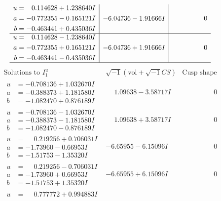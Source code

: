 \documentclass[1p]{elsarticle_modified}
\theoremstyle{definition}
\newcommand{\I}{\sqrt{-1}}
\begin{document}
$$\begin{array}{c|c|c}
\begin{aligned}
u &= \phantom{-}0.114628 + 1.238640 I \\
a &= -0.772355 - 0.165121 I \\
b &= -0.463441 + 0.435036 I\end{aligned}
 & -6.04736 - 1.91666 I & \phantom{-0.000000 } 0 \\ \hline\begin{aligned}
u &= \phantom{-}0.114628 - 1.238640 I \\
a &= -0.772355 + 0.165121 I \\
b &= -0.463441 - 0.435036 I\end{aligned}
 & -6.04736 + 1.91666 I & \phantom{-0.000000 } 0\\
 \hline 
 \end{array}$$\newpage$$\begin{array}{c|c|c}  
\text{Solutions to }I^u_{1}& \I (\text{vol} + \sqrt{-1}CS) & \text{Cusp shape}\\
 \hline 
\begin{aligned}
u &= -0.708136 + 1.032670 I \\
a &= -0.388373 + 1.181580 I \\
b &= -1.082470 + 0.876189 I\end{aligned}
 & \phantom{-}1.09638 - 3.58717 I & \phantom{-0.000000 } 0 \\ \hline\begin{aligned}
u &= -0.708136 - 1.032670 I \\
a &= -0.388373 - 1.181580 I \\
b &= -1.082470 - 0.876189 I\end{aligned}
 & \phantom{-}1.09638 + 3.58717 I & \phantom{-0.000000 } 0 \\ \hline\begin{aligned}
u &= \phantom{-}0.219256 + 0.706031 I \\
a &= -1.73960 - 0.66953 I \\
b &= -1.51753 - 1.35320 I\end{aligned}
 & -6.65955 - 6.15096 I & \phantom{-0.000000 } 0 \\ \hline\begin{aligned}
u &= \phantom{-}0.219256 - 0.706031 I \\
a &= -1.73960 + 0.66953 I \\
b &= -1.51753 + 1.35320 I\end{aligned}
 & -6.65955 + 6.15096 I & \phantom{-0.000000 } 0 \\ \hline\begin{aligned}
u &= \phantom{-}0.777772 + 0.994883 I \\

\end{aligned}
\end{array}$$
\end{document}
